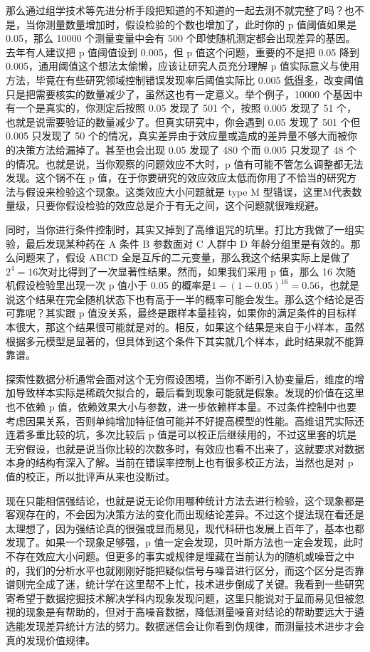 \documentclass[]{tufte-book}
\begin{document}
那么通过组学技术等先进分析手段把知道的不知道的一起去测不就完整了吗？也不是，当你测量数量增加时，假设检验的个数也增加了，此时你的 p 值阈值如果是 0.05，那么 10000 个测量变量中会有 500 个即使随机测定都会出现差异的基因。去年有人建议把 p 值阈值设到 0.005，但 p 值这个问题，重要的不是把 0.05 降到 0.005，通用阈值这个想法太偷懒，应该让研究人员充分理解 p 值实际意义与使用方法，毕竟在有些研究领域控制错误发现率后阈值实际比 0.005 \href{http://www.nature.com/news/one-size-fits-all-threshold-for-p-values-under-fire-1.22625}{低得多}，改变阈值只是把需要核实的数量减少了，虽然这也有一定意义。举个例子，10000 个基因中有一个是真实的，你测定后按照 0.05 发现了 501 个，按照 0.005 发现了 51 个，也就是说需要验证的数量减少了。但真实研究中，你会遇到 0.05 发现了 501 个但 0.005 只发现了 50 个的情况，真实差异由于效应量或造成的差异量不够大而被你的决策方法给漏掉了。甚至也会出现 0.05 发现了 480 个而 0.005 只发现了 48 个的情况。也就是说，当你观察的问题效应不大时，p 值有可能不管怎么调整都无法发现。这个锅不在 p 值，在于你要研究的效应效应太低而你用了不恰当的研究方法与假设来检验这个现象。这类效应大小问题就是 type M 型错误，这里M代表数量级，只要你假设检验的效应总是介于有无之间，这个问题就很难规避。

同时，当你进行条件控制时，其实又掉到了高维诅咒的坑里。打比方我做了一组实验，最后发现某种药在 A 条件 B 参数面对 C 人群中 D 年龄分组里是有效的。那么问题来了，假设 ABCD 全是互斥的二元变量，那么我这个结果实际上是做了\(2^4 = 16\)次对比得到了一次显著性结果。然而，如果我们采用 p 值，那么 16 次随机假设检验里出现一次 p 值小于 0.05 的概率是\(1-(1-0.05)^{16} = 0.56\)，也就是说这个结果在完全随机状态下也有高于一半的概率可能会发生。那么这个结论是否可靠呢？其实跟 p 值没关系，最终是跟样本量挂钩，如果你的满足条件的目标样本很大，那这个结果很可能就是对的。相反，如果这个结果是来自于小样本，虽然根据多元模型是显著的，但具体到这个条件下其实就几个样本，此时结果就不能算靠谱。

探索性数据分析通常会面对这个无穷假设困境，当你不断引入协变量后，维度的增加导致样本实际是稀疏欠拟合的，最后看到现象可能就是假象。发现的价值在这里也不依赖 p 值，依赖效果大小与参数，进一步依赖样本量。不过条件控制中也要考虑因果关系，否则单纯增加特征值可能并不好提高模型的性能。高维诅咒实际还连着多重比较的坑，多次比较后 p 值是可以校正后继续用的，不过这里套的坑是无穷假设，也就是说当你比较的次数多时，有效应也看不出来了，这就要求对数据本身的结构有深入了解。当前在错误率控制上也有很多校正方法，当然也是对 p 值的校正，所以批评声从来也没断过。

现在只能相信强结论，也就是说无论你用哪种统计方法去进行检验，这个现象都是客观存在的，不会因为决策方法的变化而出现结论差异。不过这个提法现在看还是太理想了，因为强结论真的很强或显而易见，现代科研也发展上百年了，基本也都发现了。如果一个现象足够强，p 值一定会发现，贝叶斯方法也一定会发现，此时不存在效应大小问题。但更多的事实或规律是埋藏在当前认为的随机或噪音之中的，我们的分析水平也就刚刚好能把疑似信号与噪音进行区分，而这个区分是否靠谱则完全成了迷，统计学在这里帮不上忙，技术进步倒成了关键。我看到一些研究寄希望于数据挖掘技术解决学科内现象发现问题，这里只能说对于显而易见但被忽视的现象是有帮助的，但对于高噪音数据，降低测量噪音对结论的帮助要远大于遴选能发现差异统计方法的努力。数据迷信会让你看到伪规律，而测量技术进步才会真的发现价值规律。
\end{document}
